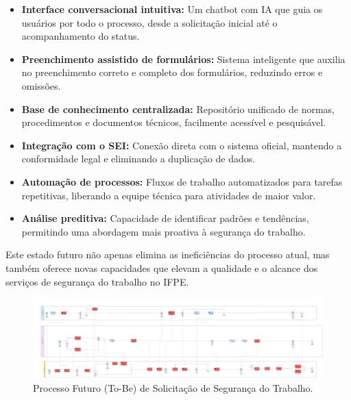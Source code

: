 \documentclass[12pt,a4paper]{article}
\begin{document}
\begin{itemize}
    \item \textbf{Interface conversacional intuitiva:} Um chatbot com IA que guia os usuários por todo o processo, desde a solicitação inicial até o acompanhamento do status.
    
    \item \textbf{Preenchimento assistido de formulários:} Sistema inteligente que auxilia no preenchimento correto e completo dos formulários, reduzindo erros e omissões.
    
    \item \textbf{Base de conhecimento centralizada:} Repositório unificado de normas, procedimentos e documentos técnicos, facilmente acessível e pesquisável.
    
    \item \textbf{Integração com o SEI:} Conexão direta com o sistema oficial, mantendo a conformidade legal e eliminando a duplicação de dados.
    
    \item \textbf{Automação de processos:} Fluxos de trabalho automatizados para tarefas repetitivas, liberando a equipe técnica para atividades de maior valor.
    
    \item \textbf{Análise preditiva:} Capacidade de identificar padrões e tendências, permitindo uma abordagem mais proativa à segurança do trabalho.
\end{itemize}

Este estado futuro não apenas elimina as ineficiências do processo atual, mas também oferece novas capacidades que elevam a qualidade e o alcance dos serviços de segurança do trabalho no IFPE.

\begin{landscape}
\begin{figure}[p]
\centering
\includegraphics[width=0.85\paperwidth, height=0.8\paperheight, keepaspectratio]{images/TO-BE.jpg}
\caption{Processo Futuro (To-Be) de Solicitação de Segurança do Trabalho.}
\end{figure}
\end{landscape}
\end{document}
